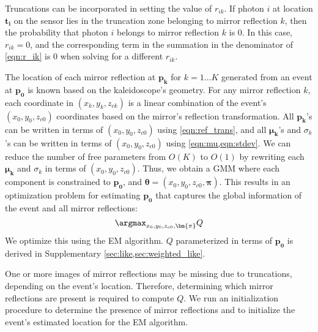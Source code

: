 Truncations can be incorporated in setting the value of $r_{ik}$. 
If photon $i$ at location $\bm{t_i}$ on the sensor lies in the truncation zone 
belonging to mirror reflection $k$, then the probability that photon 
$i$ belongs to mirror reflection $k$ is 0. 
In this case, $r_{ik}=0$, and the corresponding term in the 
summation in the denominator of \cref{eqn:r_ik} is 0 when solving for a different $r_{ik}$.

The location of each mirror reflection at $\bm{p_k}$ for $k=1...K$ generated from 
an event at $\bm{p_0}$ is known based on the kaleidoscope's geometry.
For any mirror reflection $k$, each coordinate in $(x_k,y_k,z_{ck})$ is a linear 
combination of the event's $(x_0,y_0,z_{c0})$ coordinates based on the mirror's 
reflection transformation.
All $\bm{p_k}$'s can be written in terms of $(x_0,y_0,z_{c0})$ using 
\cref{eqn:ref_trans}, and all $\bm{\mu_k}$'s and $\sigma_k$'s can be written in 
terms of $(x_0,y_0,z_{c0})$ using \cref{eqn:mu,eqn:stdev}.
We can reduce the number of free parameters from $O(K)$ 
to $O(1)$ by rewriting each $\bm{\mu_k}$ and $\sigma_k$ in terms of 
$(x_0,y_0,z_{c0})$.
Thus, we obtain a GMM where each component is constrained to $\bm{p_0}$, and 
$\bm{\theta}=(x_0,y_0,z_{c0},\bm{\pi})$.
This results in an optimization problem for estimating $\bm{p_0}$ that captures 
the global information of the event and all mirror reflections:
\begin{equation} \label{eqn:opti_prob}
\argmax_{x_0,y_0,z_{c0},\bm{\pi}} Q
\end{equation}
We optimize this using the EM algorithm.
$Q$ parameterized in terms of $\bm{p_0}$ is derived in Supplementary \cref*{sec:like,sec:weighted_like}.

One or more images of mirror reflections may be missing due to truncations, 
depending on the event's location.
Therefore, determining which mirror reflections are present is required to compute $Q$.
We run an initialization procedure to determine the presence of mirror reflections 
and to initialize the event's estimated location for the EM algorithm.

